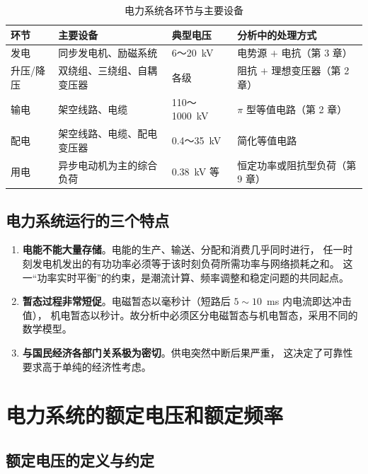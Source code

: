 \begin{table}[htbp]
  \centering
  \caption{电力系统各环节与主要设备}
  \small
  \begin{tabular}{@{}llll@{}}
    \toprule
    环节 & 主要设备 & 典型电压 & 分析中的处理方式 \\
    \midrule
    发电 & 同步发电机、励磁系统 & 6～20~kV & 电势源 $+$ 电抗（第 3 章） \\
    升压/降压 & 双绕组、三绕组、自耦变压器 & 各级 & 阻抗 $+$ 理想变压器（第 2 章） \\
    输电 & 架空线路、电缆 & 110～1000~kV & $\pi$ 型等值电路（第 2 章） \\
    配电 & 架空线路、电缆、配电变压器 & 0.4～35~kV & 简化等值电路 \\
    用电 & 异步电动机为主的综合负荷 & 0.38~kV 等 & 恒定功率或阻抗型负荷（第 9 章） \\
    \bottomrule
  \end{tabular}
\end{table}

\subsection{电力系统运行的三个特点}

\begin{enumerate}
  \item \textbf{电能不能大量存储}。电能的生产、输送、分配和消费几乎同时进行，
        任一时刻发电机发出的有功功率必须等于该时刻负荷所需功率与网络损耗之和。
        这一“功率实时平衡”的约束，是潮流计算、频率调整和稳定问题的共同起点。
  \item \textbf{暂态过程非常短促}。电磁暂态以毫秒计（短路后 $5\sim 10$~ms 内电流即达冲击值），
        机电暂态以秒计。故分析中必须区分电磁暂态与机电暂态，采用不同的数学模型。
  \item \textbf{与国民经济各部门关系极为密切}。供电突然中断后果严重，
        这决定了可靠性要求高于单纯的经济性考虑。
\end{enumerate}


\section{电力系统的额定电压和额定频率}

\subsection{额定电压的定义与约定}

